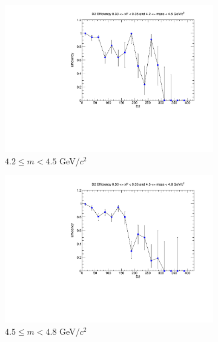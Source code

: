 \documentclass[11pt]{article}
\begin{document}
\begin{figure}[p]
    \centering
    \begin{subfigure}[b]{0.32\textwidth}
        \centering
        \includegraphics[width=\textwidth]{./kTrackerEfficiencyPlots/D2_Efficiency_xF6_mass0.pdf}
        \caption{$4.2 \leq m < 4.5$ GeV/$c^2$}
    \end{subfigure}\hfill
    \begin{subfigure}[b]{0.32\textwidth}
        \centering
        \includegraphics[width=\textwidth]{./kTrackerEfficiencyPlots/D2_Efficiency_xF6_mass1.pdf}
        \caption{$4.5 \leq m < 4.8$ GeV/$c^2$}
    \end{subfigure}\hfill
    \begin{subfigure}[b]{0.32\textwidth}
        \centering

\end{subfigure}
\end{figure}
\end{document}
